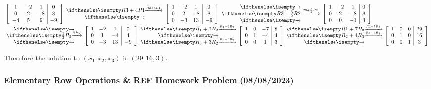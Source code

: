 \documentclass[
  letterpaper,
  DIV=11,
  numbers=noendperiod]{scrartcl}
\begin{document}
\begin{align*}
&\left[\begin{array}{ccc|c}
1 & -2 & 1 & 0 \\ 0 & 2 & -8 & 8 \\ -4 & 5 & 9 & -9
\end{array}\right]\rowops{R3+4R1,}\left[\begin{array}{ccc|c}1 & -2 & 1 & 0 \\ 0 & 2 & -8 & 8 \\ 0 & -3 & 13 & -9 \end{array}\right]\rowops{,R3+\frac{3}{2}R2,}\left[\begin{array}{ccc|c}1 & -2 & 1 & 0 \\ 0 & 2 & -8 & 8 \\ 0 & 0 & -1 & 3 \end{array}\right] \\
&\rowops{,\frac{1}{2}R_2,}
\left[\begin{array}{ccc|c}
1 & -2 & 1 & 0 \\ 0 & 1 & -4 & 4 \\ 0 & -3 & 13 & -9 
\end{array}\right] \rowops{R_1+2R_2,,R_3+3R_2}\left[\begin{array}{ccc|c}
1 & 0 & -7 & 8 \\ 0 & 1 & -4 & 4 \\ 0 & 0 & 1 & 3
\end{array}\right]\rowops{R1+7R_3,R_2+4R_3,}\left[\begin{array}{ccc|c}
1 & 0 & 0 & 29 \\ 0 & 1 & 0 & 16 \\ 0 & 0 & 1 & 3
\end{array}\right]
\end{align*}

Therefore the solution to \((x_1, x_2, x_3)\) is \((29, 16, 3)\).

\subsubsection{Elementary Row Operations \& REF Homework Problem
(08/08/2023)}\label{elementary-row-operations-ref-homework-problem-08082023}

\end{document}
